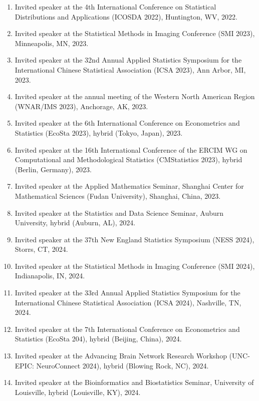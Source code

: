 \documentclass[12pt]{article}
\begin{document}
\begin{enumerate}
		\item Invited speaker at the 4th International Conference on 
		Statistical Distributions and Applications (ICOSDA 2022), 
		Huntington, WV, 2022. 
		
		\item Invited speaker at the Statistical Methods in Imaging 
		Conference (SMI 2023), Minneapolis, MN, 2023.
		
		\item Invited speaker at the 32nd Annual Applied Statistics 
		Symposium for the International Chinese Statistical 
		Association (ICSA 2023), Ann Arbor, MI, 2023.
		
		\item Invited speaker at the annual meeting of the Western 
		North American Region (WNAR/IMS 2023), Anchorage, AK, 2023.
		
		\item Invited speaker at the 6th International Conference on 
		Econometrics and Statistics (EcoSta 2023), hybrid (Tokyo, 
		Japan), 2023.
		
		\item Invited speaker at the 16th International Conference 
		of the ERCIM WG on Computational and Methodological 
		Statistics (CMStatistics 2023), hybrid (Berlin, Germany), 
		2023.
		
		\item Invited speaker at the Applied Mathematics Seminar, 
		Shanghai Center for Mathematical Sciences (Fudan 
		University), Shanghai, China, 2023.	
		
		\item Invited speaker at the Statistics and Data Science 
		Seminar, Auburn University, hybrid (Auburn, AL), 2024.	
		
		\item Invited speaker at the 37th New England Statistics 
		Symposium (NESS 2024), Storrs, CT, 2024.
		
		\item Invited speaker at the Statistical Methods in Imaging 
		Conference (SMI 2024), Indianapolis, IN, 2024.
		
		\item Invited speaker at the 33rd Annual Applied Statistics 
		Symposium for the International Chinese Statistical 
		Association (ICSA 2024), Nashville, TN, 2024.
		
		\item Invited speaker at the 7th International Conference on 
		Econometrics and Statistics (EcoSta 204), hybrid (Beijing, 
		China), 2024.
		
		\item Invited speaker at the Advancing Brain Network 
		Research Workshop (UNC-EPIC: NeuroConnect 2024), hybrid 
		(Blowing Rock, NC), 2024.
		
		\item Invited speaker at the Bioinformatics and 
		Biostatistics Seminar, University of Louisville, hybrid 
		(Louisville, KY), 2024.	
	\end{enumerate}
	
\end{document}
